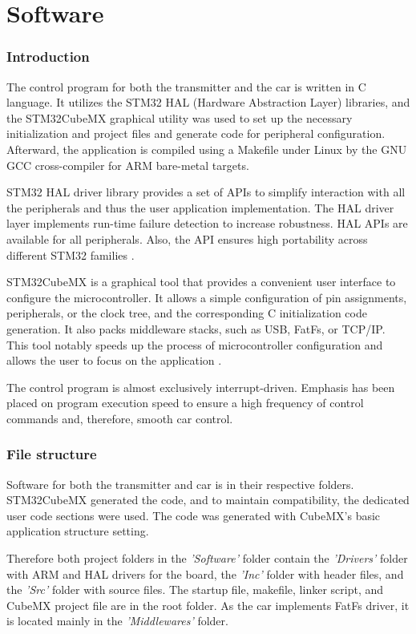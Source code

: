 


\part{Software}
\label{chap:software}
\section{Introduction}
The control program for both the transmitter and the car is written in C language. It utilizes the STM32 HAL (Hardware Abstraction Layer) libraries, and the STM32CubeMX graphical utility was used to set up the necessary initialization and project files and generate code for peripheral configuration. Afterward, the application is compiled using a Makefile under Linux by the GNU GCC cross-compiler for ARM bare-metal targets.

STM32 HAL driver library provides a set of APIs to simplify interaction with all the peripherals and thus the user application implementation. The HAL driver layer implements run-time failure detection to increase robustness. HAL APIs are available for all peripherals. Also, the API ensures high portability across different STM32 families \cite{hal}.

STM32CubeMX is a graphical tool that provides a convenient user interface to configure the microcontroller. It allows a simple configuration of pin assignments, peripherals, or the clock tree, and the corresponding C initialization code generation. It also packs middleware stacks, such as USB, FatFs, or TCP/IP. This tool notably speeds up the process of microcontroller configuration and allows the user to focus on the application \cite{cubemx}.

The control program is almost exclusively interrupt-driven. Emphasis has been placed on program execution speed to ensure a high frequency of control commands and, therefore, smooth car control.

\section{File structure}
Software for both the transmitter and car is in their respective folders. STM32CubeMX generated the code, and to maintain compatibility, the dedicated user code sections were used. The code was generated with CubeMX's basic application structure setting.

Therefore both project folders in the \textit{'Software'} folder contain the \textit{'Drivers'} folder with ARM and HAL drivers for the board, the \textit{'Inc'} folder with header files, and the \textit{'Src'} folder with source files. The startup file, makefile, linker script, and CubeMX project file are in the root folder. As the car implements FatFs driver, it is located mainly in the \textit{'Middlewares'} folder.

